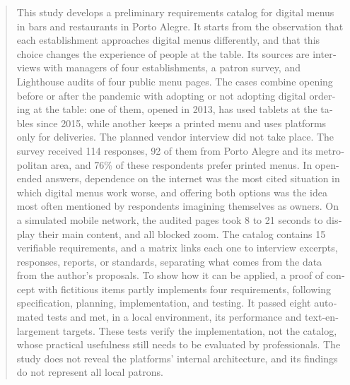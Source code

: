 \documentclass[artigo,english,brazilian]{UNISINOSmonografia}
\begin{document}
%
\begin{otherlanguage}{english}
\begin{abstract}
This study develops a preliminary requirements catalog for digital menus in bars and restaurants in Porto Alegre. It starts from the observation that each establishment approaches digital menus differently, and that this choice changes the experience of people at the table. Its sources are interviews with managers of four establishments, a patron survey, and Lighthouse audits of four public menu pages. The cases combine opening before or after the pandemic with adopting or not adopting digital ordering at the table: one of them, opened in 2013, has used tablets at the tables since 2015, while another keeps a printed menu and uses platforms only for deliveries. The planned vendor interview did not take place. The survey received 114 responses, 92 of them from Porto Alegre and its metropolitan area, and 76\% of these respondents prefer printed menus. In open-ended answers, dependence on the internet was the most cited situation in which digital menus work worse, and offering both options was the idea most often mentioned by respondents imagining themselves as owners. On a simulated mobile network, the audited pages took 8 to 21 seconds to display their main content, and all blocked zoom. The catalog contains 15 verifiable requirements, and a matrix links each one to interview excerpts, responses, reports, or standards, separating what comes from the data from the author's proposals. To show how it can be applied, a proof of concept with fictitious items partly implements four requirements, following specification, planning, implementation, and testing. It passed eight automated tests and met, in a local environment, its performance and text-enlargement targets. These tests verify the implementation, not the catalog, whose practical usefulness still needs to be evaluated by professionals. The study does not reveal the platforms' internal architecture, and its findings do not represent all local patrons.
\end{abstract}
\end{otherlanguage}

\end{document}
